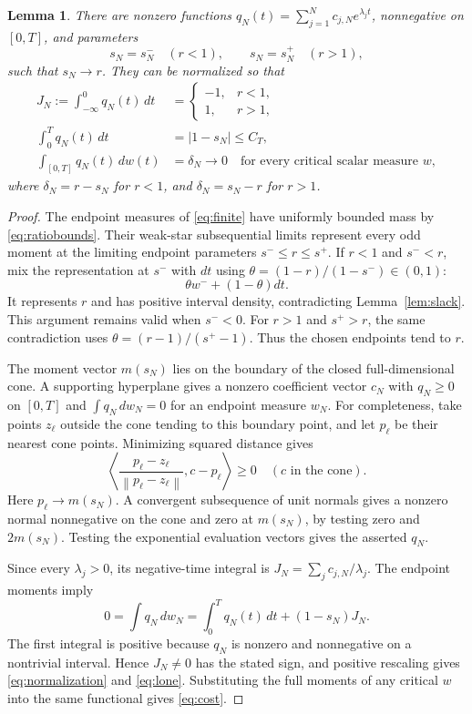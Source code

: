 \documentclass[11pt]{article}
\newtheorem{lemma}[theorem]{Lemma}
\theoremstyle{remark}
\newcommand{\norm}[1]{\left\lVert #1\right\rVert}
\begin{document}
\begin{lemma}\label{lem:dual}
There are nonzero functions
$q_N(t)=\sum_{j=1}^N c_{j,N}e^{\lambda_jt}$, nonnegative on $[0,T]$,
and parameters
\[
 s_N=s_N^-\quad(r<1),\qquad s_N=s_N^+\quad(r>1),
\]
such that $s_N\to r$. They can be normalized so that
\begin{align}
 J_N:=\int_{-\infty}^0q_N(t)\,dt
   &=\begin{cases}-1,&r<1,\\1,&r>1,\end{cases}\label{eq:normalization}\\
 \int_0^Tq_N(t)\,dt&=|1-s_N|\le C_T,\label{eq:lone}\\
 \int_{[0,T]}q_N(t)\,dw(t)&=\delta_N\longrightarrow0
       \quad\text{for every critical scalar measure }w,\label{eq:cost}
\end{align}
where $\delta_N=r-s_N$ for $r<1$, and $\delta_N=s_N-r$ for $r>1$.
\end{lemma}
\begin{proof}
The endpoint measures of \eqref{eq:finite} have uniformly bounded mass by
\eqref{eq:ratiobounds}. Their weak-star subsequential limits represent every
odd moment at the limiting endpoint parameters $s^-\le r\le s^+$.
If $r<1$ and $s^-<r$, mix the representation at $s^-$ with $dt$ using
$\theta=(1-r)/(1-s^-)\in(0,1)$:
\[
 \theta w^-+(1-\theta)dt.
\]
It represents $r$ and has positive interval density, contradicting
Lemma~\ref{lem:slack}. This argument remains valid when $s^-<0$.
For $r>1$ and $s^+>r$, the same contradiction uses
$\theta=(r-1)/(s^+-1)$. Thus the chosen endpoints tend to $r$.

The moment vector $m(s_N)$ lies on the boundary of the closed full-dimensional
cone. A supporting hyperplane gives a nonzero coefficient vector $c_N$ with
$q_N\ge0$ on $[0,T]$ and $\int q_N\,dw_N=0$ for an endpoint measure $w_N$.
For completeness, take points $z_\ell$ outside the cone tending to this
boundary point, and let $p_\ell$ be their nearest cone points. Minimizing
squared distance gives
\[
 \left\langle\frac{p_\ell-z_\ell}{\norm{p_\ell-z_\ell}},
                  c-p_\ell\right\rangle\ge0
       \quad(c\text{ in the cone}).
\]
Here $p_\ell\to m(s_N)$. A convergent subsequence of unit normals gives
a nonzero normal nonnegative on the cone and zero at $m(s_N)$, by testing
zero and $2m(s_N)$. Testing the exponential evaluation vectors gives the
asserted $q_N$.

Since every $\lambda_j>0$, its negative-time integral is
$J_N=\sum_jc_{j,N}/\lambda_j$. The endpoint moments imply
\begin{equation}\label{eq:functional}
 0=\int q_N\,dw_N
   =\int_0^Tq_N(t)\,dt+(1-s_N)J_N.
\end{equation}
The first integral is positive because $q_N$ is nonzero and nonnegative on
a nontrivial interval. Hence $J_N\ne0$ has the stated sign, and positive
rescaling gives \eqref{eq:normalization} and \eqref{eq:lone}. Substituting
the full moments of any critical $w$ into the same functional gives
\eqref{eq:cost}.
\end{proof}
\end{document}

